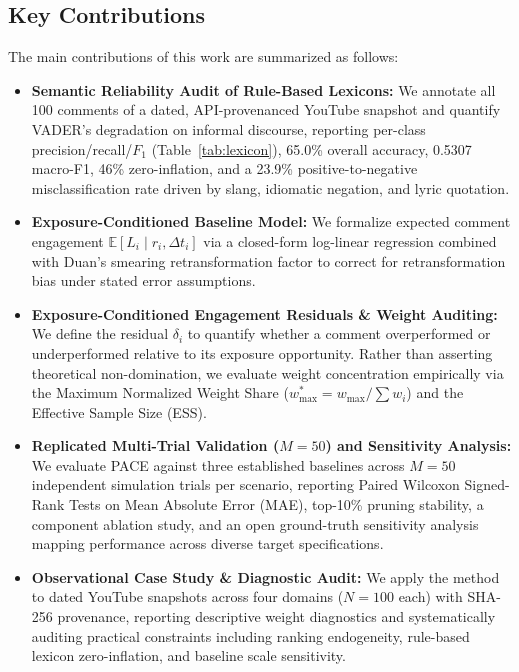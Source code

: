 \documentclass[journal]{IEEEtran}
\begin{document}
\subsection{Key Contributions}
The main contributions of this work are summarized as follows:
\begin{itemize}
    \item \textbf{Semantic Reliability Audit of Rule-Based Lexicons:} We annotate all 100 comments of a dated, API-provenanced YouTube snapshot and quantify VADER's degradation on informal discourse, reporting per-class precision/recall/$F_1$ (Table~\ref{tab:lexicon}), 65.0\% overall accuracy, 0.5307 macro-F1, 46\% zero-inflation, and a 23.9\% positive-to-negative misclassification rate driven by slang, idiomatic negation, and lyric quotation.
    \item \textbf{Exposure-Conditioned Baseline Model:} We formalize expected comment engagement $\mathbb{E}[L_i \mid r_i, \Delta t_i]$ via a closed-form log-linear regression combined with Duan's smearing retransformation factor \cite{duan1983smearing} to correct for retransformation bias under stated error assumptions.
    \item \textbf{Exposure-Conditioned Engagement Residuals \& Weight Auditing:} We define the residual $\delta_i$ to quantify whether a comment overperformed or underperformed relative to its exposure opportunity. Rather than asserting theoretical non-domination, we evaluate weight concentration empirically via the Maximum Normalized Weight Share ($w_{\max}^* = w_{\max} / \sum w_i$) and the Effective Sample Size (ESS).
    \item \textbf{Replicated Multi-Trial Validation ($M=50$) and Sensitivity Analysis:} We evaluate PACE against three established baselines across $M=50$ independent simulation trials per scenario, reporting Paired Wilcoxon Signed-Rank Tests \cite{wilcoxon1945individual} on Mean Absolute Error (MAE), top-10\% pruning stability, a component ablation study, and an open ground-truth sensitivity analysis mapping performance across diverse target specifications.
    \item \textbf{Observational Case Study \& Diagnostic Audit:} We apply the method to dated YouTube snapshots across four domains ($N = 100$ each) with SHA-256 provenance, reporting descriptive weight diagnostics and systematically auditing practical constraints including ranking endogeneity, rule-based lexicon zero-inflation, and baseline scale sensitivity.
\end{itemize}
\end{document}
